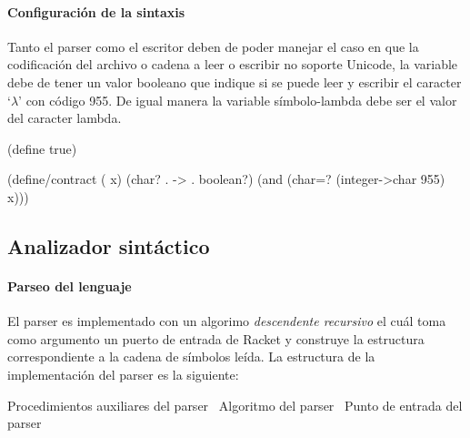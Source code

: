 \documentclass[letterpaper, twoside, openright, 11pt]{book}%
\begin{document}
\paragraph{Configuración de la sintaxis} Tanto el parser como el escritor deben de poder manejar el caso en que la codificación del archivo o cadena a leer o escribir no soporte {\Tt{}Unicode\nwendquote}, la variable {\Tt{}\nwendquote} debe de tener un valor booleano que indique si se puede leer y escribir el caracter `\( \lambda \)' con código 955. De igual manera la variable {\Tt{}símbolo-lambda\nwendquote} debe ser el valor del caracter lambda.

\nwenddocs{}\endmoddef\nwstartdeflinemarkup{}\nwenddeflinemarkup
(define  true)

(define/contract ( x)
  (char? . -> . boolean?)
  (and  (char=? (integer->char 955) x)))
\eatline
{}\nwendcode{}\nwdocspar
\subsection{Analizador sintáctico}

\paragraph{Parseo del lenguaje} El parser es implementado con un algorimo \emph{descendente recursivo} el cuál toma como argumento un puerto de entrada de {\Tt{}Racket\nwendquote} y construye la estructura correspondiente a la cadena de símbolos leída. La estructura de la implementación del parser es la siguiente:

\nwenddocs{}\endmoddef\nwstartdeflinemarkup{}\nwenddeflinemarkup
\LA{}Procedimientos auxiliares del parser~{\nwtagstyle{}}\RA{}
\LA{}Algoritmo del parser~{\nwtagstyle{}}\RA{}
\LA{}Punto de entrada del parser~{\nwtagstyle{}}\RA{}
\nwendcode{}\nwdocspar
\end{document}
